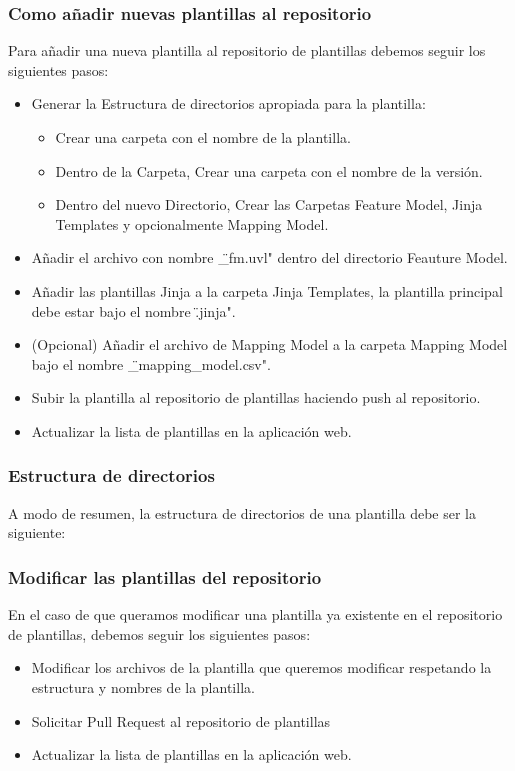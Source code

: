 \documentclass[12pt, a4paper, twoside]{article}
\begin{document}
\begin{umaappendices}
	\subsubsection{Como añadir nuevas plantillas al repositorio}
	Para añadir una nueva plantilla al repositorio de plantillas debemos seguir los siguientes pasos:
	\begin{itemize}
		\item Generar la Estructura de directorios apropiada para la plantilla:
		\begin{itemize}
			\item Crear una carpeta con el nombre de la plantilla.
			\item Dentro de la Carpeta, Crear una carpeta con el nombre de la versión.
			\item Dentro del nuevo Directorio, Crear las Carpetas Feature Model, Jinja Templates y opcionalmente Mapping Model.
		\end{itemize}
		\item Añadir el archivo con nombre \"<Nombre de la Plantilla>\_fm.uvl" dentro del directorio Feauture Model.
		\item Añadir las plantillas Jinja a la carpeta Jinja Templates, la plantilla principal debe estar bajo el nombre \"<Nombre de la Plantilla>.jinja".
		\item (Opcional) Añadir el archivo de Mapping Model  a la carpeta Mapping Model bajo el nombre \"<Nombre de la Plantilla>\_mapping\_model.csv".
		\item Subir la plantilla al repositorio de plantillas haciendo push al repositorio.
		\item Actualizar la lista de plantillas en la aplicación web.
	\end{itemize}
	\subsubsection{Estructura de directorios}
	 A modo de resumen, la estructura de directorios de una plantilla debe ser la siguiente:



	\subsubsection{Modificar las plantillas del repositorio}
	En el caso de que queramos modificar una plantilla ya existente en el repositorio de plantillas, debemos seguir los siguientes pasos:
	\begin{itemize}
		\item Modificar los archivos de la plantilla que queremos modificar respetando la estructura y nombres de la plantilla.
		\item Solicitar Pull Request al repositorio de plantillas
		\item Actualizar la lista de plantillas en la aplicación web.
	\end{itemize}


\end{umaappendices}
\end{document}
